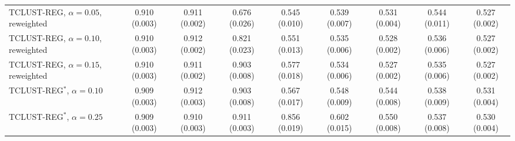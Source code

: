 \begin{table}[htbp]
{\begin{tabular}{lcccccccc}
TCLUST-REG, $\alpha=0.05$, reweighted & 0.910 (0.003) & 0.911 (0.002) & 0.676 (0.026) & 0.545 (0.010) & 0.539 (0.007) & 0.531 (0.004) & 0.544 (0.011) & 0.527 (0.002) \\
TCLUST-REG, $\alpha=0.10$, reweighted & 0.910 (0.003) & 0.912 (0.002) & 0.821 (0.023) & 0.551 (0.013) & 0.535 (0.006) & 0.528 (0.002) & 0.536 (0.006) & 0.527 (0.002) \\
TCLUST-REG, $\alpha=0.15$, reweighted & 0.910 (0.003) & 0.911 (0.002) & 0.903 (0.008) & 0.577 (0.018) & 0.534 (0.006) & 0.527 (0.002) & 0.535 (0.006) & 0.527 (0.002) \\
TCLUST-REG$^{\ast}$, $\alpha=0.10$ & 0.909 (0.003) & 0.912 (0.003) & 0.903 (0.008) & 0.567 (0.017) & 0.548 (0.009) & 0.544 (0.008) & 0.538 (0.009) & 0.531 (0.004) \\
TCLUST-REG$^{\ast}$, $\alpha=0.25$ & 0.909 (0.003) & 0.910 (0.003) & 0.911 (0.003) & 0.856 (0.019) & 0.602 (0.015) & 0.550 (0.008) & 0.537 (0.008) & 0.530 (0.004) \\
\bottomrule
\end{tabular}}
\end{table}
